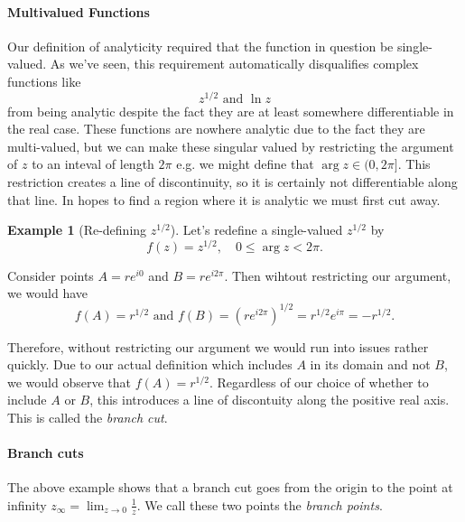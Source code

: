 \documentclass[12pt]{article}
\theoremstyle{definition}
\newtheorem{exmp}[thm]{Example}
\theoremstyle{remark}
\numberwithin{equation}{section}
\begin{document}

\paragraph{Multivalued Functions}%
\label{par:multivalued_functions}
Our definition of analyticity required that the function in question be single-valued. As we've seen, this requirement automatically disqualifies complex functions like 
\begin{equation*}
  z^{1/2} \text{ and } \ln z
\end{equation*}
from being analytic despite the fact they are at least somewhere differentiable in the real case. These functions are nowhere analytic due to the fact they are multi-valued, but we can make these singular valued by restricting the argument of $z$ to an inteval of length $2\pi$ e.g. we might define that $\arg z \in (0, 2\pi]$. This restriction creates a line of discontinuity, so it is certainly not differentiable along that line. In hopes to find a region where it is analytic we must first cut away. 

\begin{exmp}[Re-defining $z^{1/2}$]
  Let's redefine a single-valued $z^{1/2}$ by 
  \begin{equation}
    f(z) = z^{1/2}, \quad 0 \leq \arg z < 2\pi.
  \end{equation}

  Consider points $A = re^{i0}$ and $B = re^{i2\pi}$. Then wihtout restricting our argument, we would have
\begin{equation}
  f(A) = r^{1/2} \text{ and } f(B) = (re^{i2\pi})^{1/2}= r^{1/2}e^{i\pi} = -r^{1/2}. 
\end{equation}

Therefore, without restricting our argument we would run into issues rather quickly. Due to our actual definition which includes $A$ in its domain and not $B$, we would observe that $f(A) = r^{1/2}$. Regardless of our choice of whether to include $A$ or $B$, this introduces a line of discontuity along the positive real axis. This is called the \emph{branch cut}.
\end{exmp}

\paragraph{Branch cuts} The above example shows that a branch cut goes from the origin to the point at infinity $z_\infty = \lim_{z\to 0}\frac{1}{z}$. We call these two points the \emph{branch points}.
\end{document}
